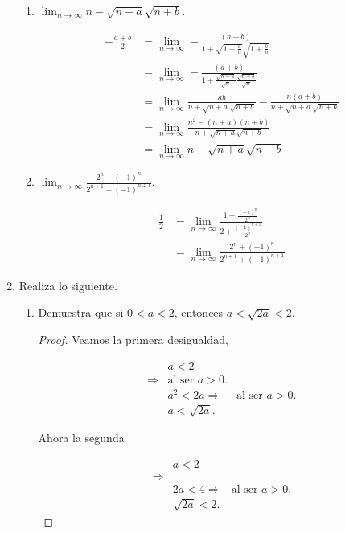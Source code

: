 \documentclass[letterpaper]{article}
\theoremstyle{definition}
\theoremstyle{lemathm}
\theoremstyle{lemademthm}
\begin{document}
\begin{enumerate}
\begin{enumerate}
			\item $\lim_{n\to\infty} n - \sqrt{n+a}\sqrt{n+b}$.
			
			\begin{align*}
				-\frac{a+b}{2} &= \lim_{n\to\infty} -\frac{(a+b)}{1 + \sqrt{1+\frac{a}{n}} \sqrt{1+\frac{b}{n}}}\\
				&= \lim_{n\to\infty} -\frac{(a+b)}{1 + \frac{\sqrt{n+a}}{\sqrt{n}}\frac{\sqrt{n+b}}{\sqrt{n}}}\\
				&= \lim_{n\to\infty} \frac{ab}{n + \sqrt{n+a}\sqrt{n+b}} - \frac{n(a+b)}{n + \sqrt{n+a}\sqrt{n+b}}\\
				&= \lim_{n\to\infty} \frac{n^2 - (n+a)(n+b)}{n + \sqrt{n+a}\sqrt{n+b}}\\
				&= \lim_{n\to\infty} n - \sqrt{n+a}\sqrt{n+b}	
			\end{align*}

			\item $\lim_{n\to\infty} \frac{2^n+(-1)^n}{2^{n+1}+(-1)^{n+1}}$.
			
			\begin{align*}
				\frac{1}{2} &= \lim_{n\to\infty} \frac{1+\frac{(-1)^n}{2^n}}{2+\frac{(-1)^{n+1}}{2^n}}\\
				&= \lim_{n\to\infty} \frac{2^n+(-1)^n}{2^{n+1}+(-1)^{n+1}}
			\end{align*}

		\end{enumerate}

		\item Realiza lo siguiente.
		
		\begin{enumerate}
			\item Demuestra que si $0 < a < 2$, entonces $a < \sqrt{2a} < 2$.
			
			\begin{proof}
				Veamos la primera desigualdad,

				\begin{align*}
					& a < 2\\
					\Rightarrow & \text{al ser $a > 0$.}\\
					& a^2 < 2a
					\Rightarrow & \text{al ser $a > 0$.}\\
					& a < \sqrt{2a}.
				\end{align*}


				Ahora la segunda

				\begin{align*}
					& a < 2\\
					\Rightarrow\\
					& 2a < 4
					\Rightarrow & \text{al ser $a > 0$.}\\
					& \sqrt{2a} < 2.
				\end{align*}


\end{proof}
\end{enumerate}
\end{enumerate}
\end{document}
